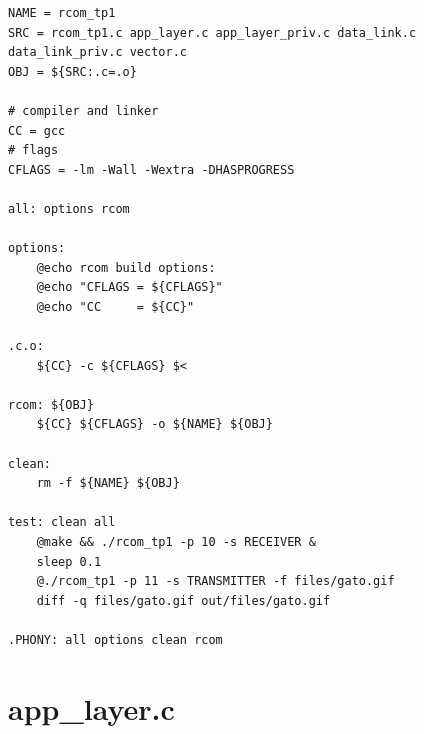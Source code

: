 \documentclass[11pt]{report}
\begin{document}
\begin{lstlisting}
NAME = rcom_tp1
SRC = rcom_tp1.c app_layer.c app_layer_priv.c data_link.c data_link_priv.c vector.c
OBJ = ${SRC:.c=.o}

# compiler and linker
CC = gcc
# flags
CFLAGS = -lm -Wall -Wextra -DHASPROGRESS

all: options rcom

options:
	@echo rcom build options:
	@echo "CFLAGS = ${CFLAGS}"
	@echo "CC     = ${CC}"

.c.o:
	${CC} -c ${CFLAGS} $<

rcom: ${OBJ}
	${CC} ${CFLAGS} -o ${NAME} ${OBJ}

clean:
	rm -f ${NAME} ${OBJ}

test: clean all
	@make && ./rcom_tp1 -p 10 -s RECEIVER &
	sleep 0.1
	@./rcom_tp1 -p 11 -s TRANSMITTER -f files/gato.gif
	diff -q files/gato.gif out/files/gato.gif

.PHONY: all options clean rcom
\end{lstlisting}

\section{app\_layer.c}
\end{document}
